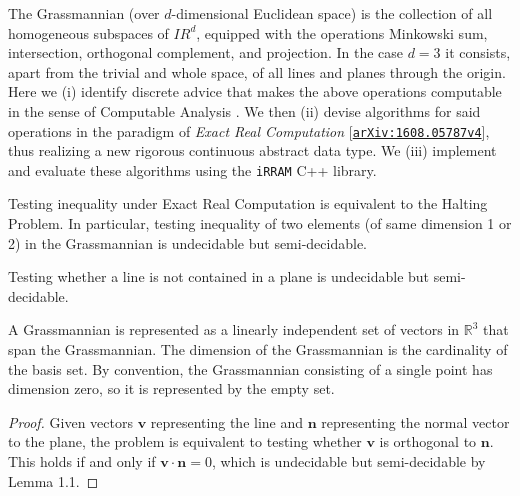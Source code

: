 \documentclass[12pt]{article}
\newcommand{\R}{\mathbb{R}}
\newcommand{\arXiv}[1]{\href{http://arXiv.org/abs/#1}{\textup{\texttt{arXiv:#1}}}\xspace}
\newenvironment{definition}[2][Definition]{\begin{trivlist}
\item[\hskip \labelsep {\bfseries #1}\hskip \labelsep {\bfseries #2.}]}{\end{trivlist}}
\newenvironment{corollary}[2][Corollary]{\begin{trivlist}
\item[\hskip \labelsep {\bfseries #1}\hskip \labelsep {\bfseries #2.}]}{\end{trivlist}}
\newenvironment{lemma}[2][Lemma]{\begin{trivlist}
\item[\hskip \labelsep {\bfseries #1}\hskip \labelsep {\bfseries #2.}]}{\end{trivlist}}
\begin{document}
 
 
\title{}
\author{Seokbin Lee, 20160464}
\maketitle

The Grassmannian (over $d$-dimensional Euclidean space) is the collection of all homogeneous subspaces of $IR^d$,
equipped with the operations Minkowski sum, intersection, orthogonal complement, and projection.
In the case $d=3$ it consists, apart from the trivial and whole space, of all lines and planes through the origin.
Here we (i) identify discrete advice \cite{Zie12} that makes the above operations computable in the sense of Computable Analysis \cite{Wei00}. We then (ii) devise algorithms for said operations in the paradigm of \emph{Exact Real Computation} [\arXiv{1608.05787v4}], thus realizing a new rigorous continuous abstract data type.
We (iii) implement and evaluate these algorithms using the \texttt{iRRAM} C++ library.

\begin{lemma}{1.1}
Testing inequality under Exact Real Computation is equivalent to the Halting Problem. In particular, testing inequality of two elements (of same dimension 1 or 2) in the Grassmannian is undecidable but semi-decidable.
\end{lemma}

\begin{corollary}{1.2}
Testing whether a line is not contained in a plane is undecidable but semi-decidable.
\end{corollary}

\begin{definition}{1.3}
A Grassmannian is represented as a linearly independent set of vectors in \(\R^3\) that span the Grassmannian. The dimension of the Grassmannian is the cardinality of the basis set. By convention, the Grassmannian consisting of a single point has dimension zero, so it is represented by the empty set.
\end{definition}

\begin{proof}
Given vectors \(\mathbf{v}\) representing the line and \(\mathbf{n}\) representing the normal vector to the plane, the problem is equivalent to testing whether \(\mathbf{v}\) is orthogonal to \(\mathbf{n}\). This holds if and only if \(\mathbf{v} \cdot \mathbf{n} = 0\), which is undecidable but semi-decidable by Lemma 1.1.
\end{proof}
\end{document}
